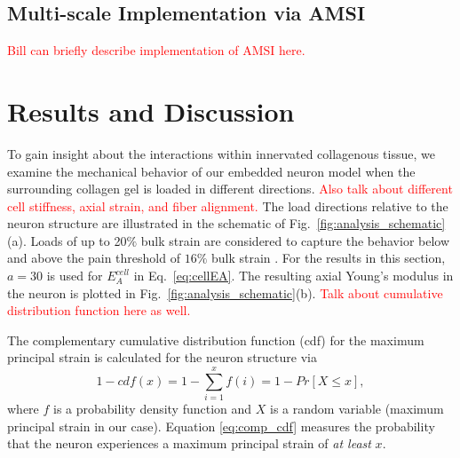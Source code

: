 \documentclass[10pt]{asme2ej}
\begin{document}
\subsection{Multi-scale Implementation via AMSI}
\textcolor{red}{Bill can briefly describe implementation of AMSI here.}

\section{Results and Discussion}
To gain insight about the interactions within innervated collagenous tissue, we examine the mechanical behavior of our embedded neuron model when the surrounding collagen gel is loaded in different directions. \textcolor{red}{Also talk about different cell stiffness, axial strain, and fiber alignment.} The load directions relative to the neuron structure are illustrated in the schematic of Fig.\ \ref{fig:analysis_schematic}(a). Loads of up to 20$\%$ bulk strain are considered to capture the behavior below and above the pain threshold of $16\%$ bulk strain \cite{Zhang:2016ga}. For the results in this section, $a=30$ is used for $E_A^{cell}$ in Eq.\ \eqref{eq:cellEA}. The resulting axial Young's modulus in the neuron is plotted in Fig.\ \ref{fig:analysis_schematic}(b). \textcolor{red}{Talk about cumulative distribution function here as well.}

The complementary cumulative distribution function (cdf) for the maximum principal strain is calculated for the neuron structure via
%
\begin{equation}
1 - cdf(x) = 1 - \sum_{i=1}^x f(i) = 1 - Pr[X \le x],
\label{eq:comp_cdf}
\end{equation}
%
where $f$ is a probability density function and $X$ is a random variable (maximum principal strain in our case). Equation \ref{eq:comp_cdf} measures the probability that the neuron experiences a maximum principal strain of \textit{at least} $x$.
\end{document}
